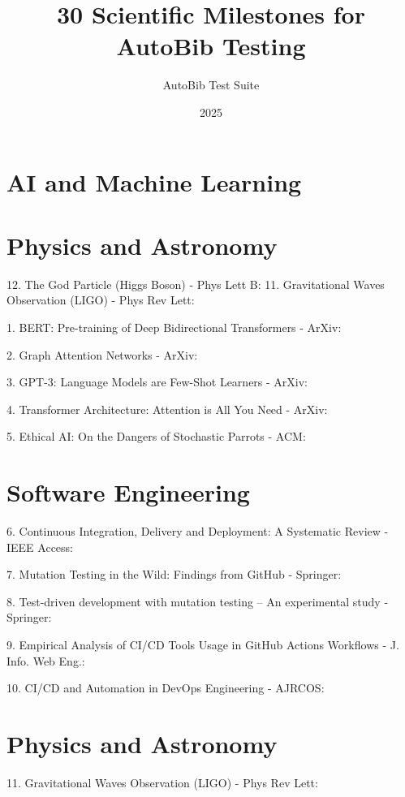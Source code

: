 \documentclass[12pt]{article}
\title{30 Scientific Milestones for AutoBib Testing}
\author{AutoBib Test Suite}
\date{2025}
\begin{document}
\maketitle
\onehalfspacing

\section{AI and Machine Learning}
\section{Physics and Astronomy}



12. The God Particle (Higgs Boson) - Phys Lett B: \cite{Aad2012observatio}
11. Gravitational Waves Observation (LIGO) - Phys Rev Lett: \cite{Abbott2016observatio}

1. BERT: Pre-training of Deep Bidirectional Transformers - ArXiv: \cite{Devlin2018bertpretra}

2. Graph Attention Networks - ArXiv: \cite{Veličković2017graphatten}

3. GPT-3: Language Models are Few-Shot Learners - ArXiv: \cite{Brown2020languagemo}

4. Transformer Architecture: Attention is All You Need - ArXiv: \cite{Vaswani2017attentioni}

5. Ethical AI: On the Dangers of Stochastic Parrots - ACM: \cite{Bender2021onthedange}

\section{Software Engineering}
6. Continuous Integration, Delivery and Deployment: A Systematic Review - IEEE Access: \cite{Shahin2017continuous}

7. Mutation Testing in the Wild: Findings from GitHub - Springer: \cite{Sánchez2022mutationte}

8. Test-driven development with mutation testing – An experimental study - Springer: \cite{Roman2021testdriven}

9. Empirical Analysis of CI/CD Tools Usage in GitHub Actions Workflows - J. Info. Web Eng.: \cite{Faqih2024empiricala}

10. CI/CD and Automation in DevOps Engineering - AJRCOS: \cite{Chava2024cicdandaut}

\section{Physics and Astronomy}
11. Gravitational Waves Observation (LIGO) - Phys Rev Lett: \cite{Abbott2016observatio}
\end{document}

